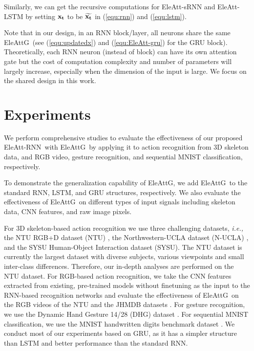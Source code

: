 \documentclass[journal]{IEEEtran}
\newcommand{\EleAttGn}{{EleAttG}}
\newcommand{\EleAttG}{{EleAttG~}}
\newcommand{\EARNN}{EleAtt-RNN}
\begin{document}
Similarly, we can get the recursive computations for EleAtt-sRNN and EleAtt-LSTM by setting $\bf{x_t}$ to be $\widetilde{\bf{x}_t}$ in (\ref{equ:rnn}) and (\ref{equ:lstm}).

Note that in our design, in an RNN block/layer, all neurons share the same \EleAttG (see (\ref{equ:updatedx}) and (\ref{equ:EleAtt-gru}) for the GRU block). Theoretically, each RNN neuron (instead of block) can have its own attention gate but the cost of computation complexity and number of parameters will largely increase, especially when the dimension of the input is large. We focus on the shared design in this work.

\section{Experiments}
We perform comprehensive studies to evaluate the effectiveness of our proposed \EARNN~with \EleAttG by applying it to action recognition from 3D skeleton data, and RGB video, gesture recognition, and sequential MNIST classification, respectively. 

To demonstrate the generalization capability of \EleAttGn, we add \EleAttG to the standard RNN, LSTM, and GRU structures, respectively. We also evaluate the effectiveness of \EleAttG on different types of input signals including skeleton data, CNN features, and raw image pixels.

For 3D skeleton-based action recognition we use three challenging datasets, {\it{i.e.},} the NTU RGB+D dataset (NTU) \cite{Shahroudy_2016_CVPR}, the Northwestern-UCLA dataset (N-UCLA) \cite{wang2014cross}, and the SYSU Human-Object Interaction dataset (SYSU)\cite{hu2015jointly}. The NTU dataset is currently the largest dataset with diverse subjects, various viewpoints and small inter-class differences. Therefore, our in-depth analyses are performed on the NTU dataset. For RGB-based action recognition, we take the CNN features extracted from existing, pre-trained models without finetuning as the input to the RNN-based recognition networks and evaluate the effectiveness of \EleAttG on the RGB videos of the NTU and the JHMDB datasets \cite{jhuang2013towards}. For gesture recognition, we use the Dynamic Hand Gesture 14/28 (DHG) dataset \cite{de2016skeleton}. For sequential MNIST classification, we use the MNIST handwritten digits benchmark dataset \cite{lecun1998gradient}.  We conduct most of our experiments based on GRU, as it has a simpler structure than LSTM and better performance than the standard RNN.
\end{document}
